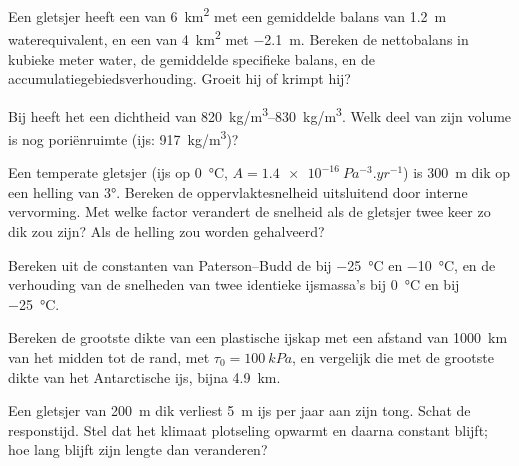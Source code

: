 \begin{exercise}[$\star$]\label{exo:b3:glaciology:3}
Een gletsjer heeft een  van \qty{6}{km^2} met een gemiddelde balans van
\qty{+1.2}{m} waterequivalent, en een  van \qty{4}{km^2} met
\qty{-2.1}{m}. Bereken de nettobalans in kubieke meter water, de gemiddelde
specifieke balans, en de accumulatiegebiedsverhouding. Groeit hij of
krimpt hij?
\end{exercise}

\begin{exercise}[$\star$]\label{exo:b3:glaciology:4}
Bij  heeft het  een dichtheid van \qtyrange{820}{830}{kg/m^3}.
Welk deel van zijn volume is nog poriënruimte (ijs:
\qty{917}{kg/m^3})?
\end{exercise}

\begin{exercise}[$\star\star$]\label{exo:b3:glaciology:5}
Een temperate gletsjer (ijs op \qty{0}{\celsius}, $A =
\qty{1.4e-16}{Pa^{-3}.yr^{-1}}$) is \qty{300}{m} dik op een helling van
\ang{3}. Bereken de oppervlaktesnelheid uitsluitend door interne vervorming. Met welke
factor verandert de snelheid als de gletsjer twee keer zo dik zou zijn? Als de helling
zou worden gehalveerd?
\end{exercise}

\begin{exercise}[$\star\star$]\label{exo:b3:glaciology:6}
Bereken uit de constanten van Paterson--Budd de  bij
\qty{-25}{\celsius} en \qty{-10}{\celsius}, en de verhouding van de snelheden van
twee identieke ijsmassa's bij \qty{0}{\celsius} en bij \qty{-25}{\celsius}.
\end{exercise}

\begin{exercise}[$\star\star$]\label{exo:b3:glaciology:7}
Bereken de grootste dikte van een plastische ijskap met een afstand van \qty{1000}{km}
van het midden tot de rand, met $\tau_0 = \qty{100}{kPa}$, en vergelijk die met de
grootste dikte van het Antarctische ijs, bijna \qty{4.9}{km}.
\end{exercise}

\begin{exercise}[$\star\star$]\label{exo:b3:glaciology:8}
Een gletsjer van \qty{200}{m} dik verliest \qty{5}{m} ijs per jaar aan zijn tong.
Schat de responstijd. Stel dat het klimaat plotseling opwarmt en daarna constant blijft;
hoe lang blijft zijn lengte dan veranderen?
\end{exercise}

